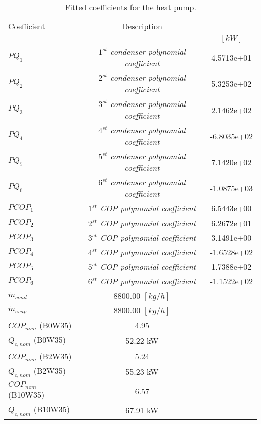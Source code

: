 \documentclass[english]{SPFShortReport}
\author{Dani Carbonell}
\begin{document}
\begin{table}[!ht]
\begin{small}
\caption{Fitted coefficients for the heat pump.}
\begin{center}
\resizebox{12cm}{!} 
{
\begin{tabular}{l | c c } 
\hline
\hline
Coefficient &Description & \\ 
 & &$[kW]$\\ 
\hline
$PQ_{1}$ & \emph{$1^{st}$ condenser polynomial coefficient}  & 4.5713e+01    \\ 
$PQ_{2}$ & \emph{$2^{st}$ condenser polynomial coefficient}  & 5.3253e+02    \\ 
$PQ_{3}$ & \emph{$3^{st}$ condenser polynomial coefficient}  & 2.1462e+02    \\ 
$PQ_{4}$ & \emph{$4^{st}$ condenser polynomial coefficient}  & -6.8035e+02    \\ 
$PQ_{5}$ & \emph{$5^{st}$ condenser polynomial coefficient}  & 7.1420e+02    \\ 
$PQ_{6}$ & \emph{$6^{st}$ condenser polynomial coefficient}  & -1.0875e+03    \\ 
\hline
$PCOP_{1}$ & \emph{$1^{st}$ COP polynomial coefficient}  & 6.5443e+00    \\ 
$PCOP_{2}$ & \emph{$2^{st}$ COP polynomial coefficient}  & 6.2672e+01    \\ 
$PCOP_{3}$ & \emph{$3^{st}$ COP polynomial coefficient}  & 3.1491e+00    \\ 
$PCOP_{4}$ & \emph{$4^{st}$ COP polynomial coefficient}  & -1.6528e+02    \\ 
$PCOP_{5}$ & \emph{$5^{st}$ COP polynomial coefficient}  & 1.7388e+02    \\ 
$PCOP_{6}$ & \emph{$6^{st}$ COP polynomial coefficient}  & -1.1522e+02    \\ 
\hline
$\dot m_{cond}$ & 8800.00 $[kg/h]$\\ 
$\dot m_{evap}$ & 8800.00 $[kg/h]$\\ 
\hline
$COP_{nom}$ (B0W35)& 4.95 \\ 
$Q_{c,nom}$ (B0W35)& 52.22 kW\\ 
$COP_{nom}$ (B2W35)& 5.24 \\ 
$Q_{c,nom}$ (B2W35)& 55.23 kW\\ 
$COP_{nom}$ (B10W35)& 6.57 \\ 
$Q_{c,nom}$ (B10W35)& 67.91 kW\\ 
\hline
\hline
\end{tabular}
}
\label{CoefTable}
\end{center}
\end{small}
\end{table}
\end{document}
